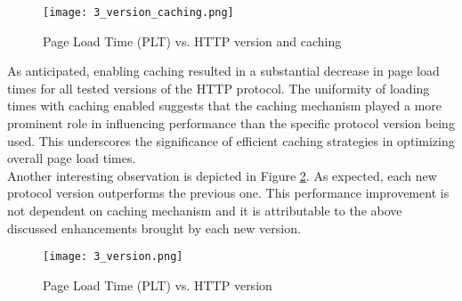     \begin{figure}[H]
        \centering
        \texttt{[image: 3\_version\_caching.png]}
        \caption{\small Page Load Time (PLT) vs. HTTP version and caching}
        \label{fig:3_version_caching}
    \end{figure}

As anticipated, enabling caching resulted in a substantial decrease in page load times for all tested versions of the HTTP protocol. 
The uniformity of loading times with caching enabled suggests that the caching mechanism played a more prominent role in influencing performance than the 
specific protocol version being used. This underscores the significance of efficient caching strategies in optimizing overall page load times.\\
Another interesting observation is depicted in Figure \ref{fig:3_version}. As expected, each new protocol version outperforms the previous one.
This performance improvement is not dependent on caching mechanism and it is attributable to the above discussed enhancements brought by each new version.

    \begin{figure}[H]
        \centering
        \texttt{[image: 3\_version.png]}
        \caption{\small Page Load Time (PLT) vs. HTTP version}
        \label{fig:3_version}
    \end{figure}
